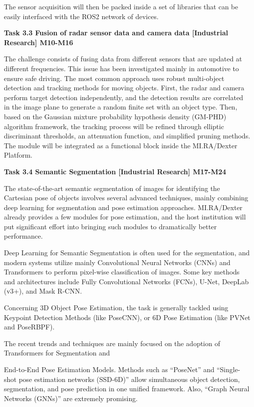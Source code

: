 \begin{longtable}[]
{\begin{minipage}[t]{\linewidth}
The sensor acquisition will then be packed inside a set of libraries
that can be easily interfaced with the ROS2 network of devices.

\textbf{Task 3.3 Fusion of radar sensor data and camera data
{[}Industrial Research{]} M10-M16}

The challenge consists of fusing data from different sensors that are
updated at different frequencies. This issue has been investigated
mainly in automotive to ensure safe driving. The most common approach
uses robust multi-object detection and tracking methods for moving
objects. First, the radar and camera perform target detection
independently, and the detection results are correlated in the image
plane to generate a random finite set with an object type. Then, based
on the Gaussian mixture probability hypothesis density (GM-PHD)
algorithm framework, the tracking process will be refined through
elliptic discriminant thresholds, an attenuation function, and
simplified pruning methods. The module will be integrated as a
functional block inside the MI.RA/Dexter Platform.

\textbf{Task 3.4 Semantic Segmentation {[}Industrial Research{]}
M17-M24}

The state-of-the-art semantic segmentation of images for identifying the
Cartesian pose of objects involves several advanced techniques, mainly
combining deep learning for segmentation and pose estimation approaches.
MI.RA/Dexter already provides a few modules for pose estimation, and the
host institution will put significant effort into bringing such modules
to dramatically better performance.

Deep Learning for Semantic Segmentation is often used for the
segmentation, and modern systems utilize mainly Convolutional Neural
Networks (CNNs) and Transformers to perform pixel-wise classification of
images. Some key methods and architectures include Fully Convolutional
Networks (FCNs), U-Net, DeepLab (v3+), and Mask R-CNN.

Concerning 3D Object Pose Estimation, the task is generally tackled
using Keypoint Detection Methods (like PoseCNN), or 6D Pose Estimation
(like PVNet and PoseRBPF).

The recent trends and techniques are mainly focused on the adoption of
Transformers for Segmentation and

End-to-End Pose Estimation Models. Methods such as ``PoseNet'' and
``Single-shot pose estimation networks (SSD-6D)'' allow simultaneous
object detection, segmentation, and pose prediction in one unified
framework. Also, ``Graph Neural Networks (GNNs)'' are extremely
promising.


\end{minipage}}
\end{longtable}
